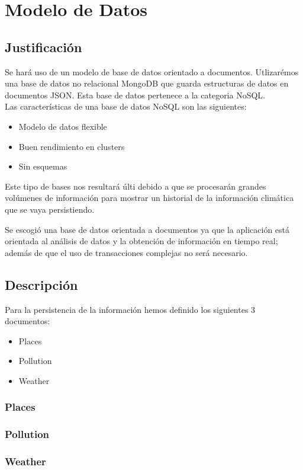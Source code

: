 \clearpage
\chapter{Modelo de Datos}

\section{Justificación}
Se hará uso de un modelo de base de datos orientado a documentos. Utlizarémos una base de datos no relacional MongoDB que guarda estructuras de datos en documentos JSON. Esta base de datos pertenece a la categoria NoSQL. \\
\newline
Las características de una base de datos NoSQL son las siguientes:

\begin{itemize}
  \item Modelo de datos flexible
  \item Buen rendimiento en clusters 
  \item Sin esquemas
\end{itemize}

Este tipo de bases nos resultará últi debido a que se procesarán grandes volúmenes de información para mostrar un historial de la información climática que se vaya persistiendo. 

Se escogió una base de datos orientada a documentos ya que la aplicación está orientada al análisis de datos y la obtención de información en tiempo real; además de que el uso de transacciones complejas no será necesario. 

\section{Descripción}
Para la persistencia de la información hemos definido los siguientes 3 documentos:   
\begin{itemize}
  \item Places
  \item Pollution
  \item Weather  
\end{itemize}

\subsection{Places}
   

\subsection{Pollution}
   

\subsection{Weather}
   

